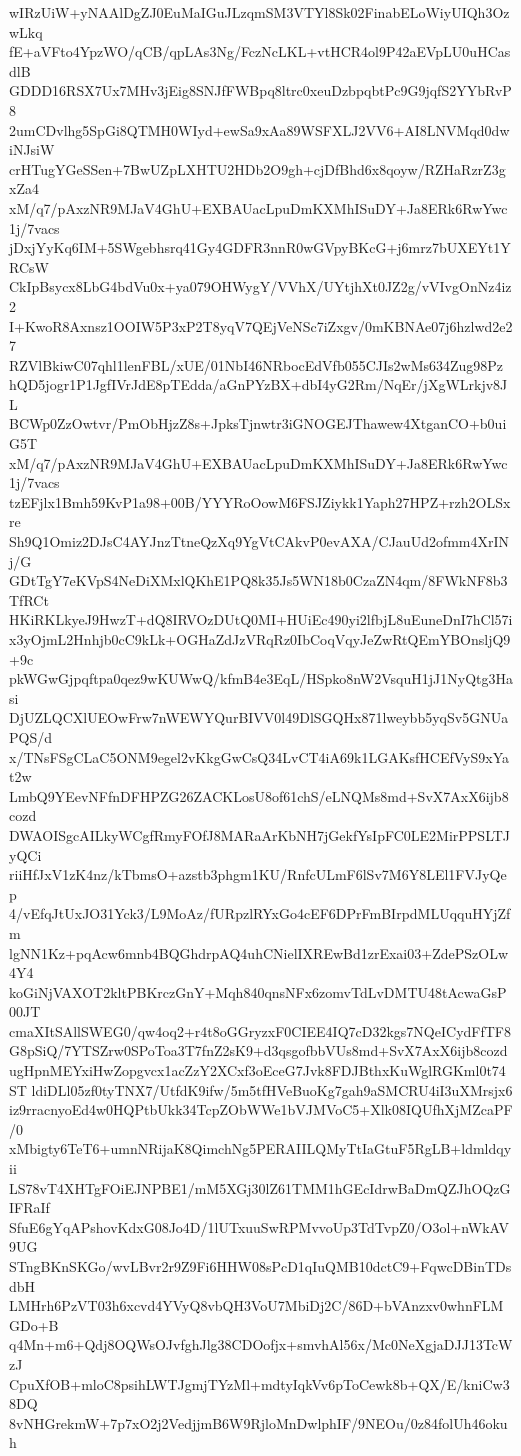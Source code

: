 wIRzUiW+yNAAlDgZJ0EuMaIGuJLzqmSM3VTYl8Sk02FinabELoWiyUIQh3OzwLkq
fE+aVFto4YpzWO/qCB/qpLAs3Ng/FczNcLKL+vtHCR4ol9P42aEVpLU0uHCasdlB
GDDD16RSX7Ux7MHv3jEig8SNJfFWBpq8ltrc0xeuDzbpqbtPc9G9jqfS2YYbRvP8
2umCDvlhg5SpGi8QTMH0WIyd+ewSa9xAa89WSFXLJ2VV6+AI8LNVMqd0dwiNJsiW
crHTugYGeSSen+7BwUZpLXHTU2HDb2O9gh+cjDfBhd6x8qoyw/RZHaRzrZ3gxZa4
xM/q7/pAxzNR9MJaV4GhU+EXBAUacLpuDmKXMhISuDY+Ja8ERk6RwYwc1j/7vacs
jDxjYyKq6IM+5SWgebhsrq41Gy4GDFR3nnR0wGVpyBKcG+j6mrz7bUXEYt1YRCsW
CkIpBsycx8LbG4bdVu0x+ya079OHWygY/VVhX/UYtjhXt0JZ2g/vVIvgOnNz4iz2
I+KwoR8Axnsz1OOIW5P3xP2T8yqV7QEjVeNSc7iZxgv/0mKBNAe07j6hzlwd2e27
RZVlBkiwC07qhl1lenFBL/xUE/01NbI46NRbocEdVfb055CJIs2wMs634Zug98Pz
hQD5jogr1P1JgfIVrJdE8pTEdda/aGnPYzBX+dbI4yG2Rm/NqEr/jXgWLrkjv8JL
BCWp0ZzOwtvr/PmObHjzZ8s+JpksTjnwtr3iGNOGEJThawew4XtganCO+b0uiG5T
xM/q7/pAxzNR9MJaV4GhU+EXBAUacLpuDmKXMhISuDY+Ja8ERk6RwYwc1j/7vacs
tzEFjlx1Bmh59KvP1a98+00B/YYYRoOowM6FSJZiykk1Yaph27HPZ+rzh2OLSxre
Sh9Q1Omiz2DJsC4AYJnzTtneQzXq9YgVtCAkvP0evAXA/CJauUd2ofmm4XrINj/G
GDtTgY7eKVpS4NeDiXMxlQKhE1PQ8k35Js5WN18b0CzaZN4qm/8FWkNF8b3TfRCt
HKiRKLkyeJ9HwzT+dQ8IRVOzDUtQ0MI+HUiEc490yi2lfbjL8uEuneDnI7hCl57i
x3yOjmL2Hnhjb0cC9kLk+OGHaZdJzVRqRz0IbCoqVqyJeZwRtQEmYBOnsljQ9+9c
pkWGwGjpqftpa0qez9wKUWwQ/kfmB4e3EqL/HSpko8nW2VsquH1jJ1NyQtg3Hasi
DjUZLQCXlUEOwFrw7nWEWYQurBIVV0l49DlSGQHx871lweybb5yqSv5GNUaPQS/d
x/TNsFSgCLaC5ONM9egel2vKkgGwCsQ34LvCT4iA69k1LGAKsfHCEfVyS9xYat2w
LmbQ9YEevNFfnDFHPZG26ZACKLosU8of61chS/eLNQMs8md+SvX7AxX6ijb8cozd
DWAOISgcAILkyWCgfRmyFOfJ8MARaArKbNH7jGekfYsIpFC0LE2MirPPSLTJyQCi
riiHfJxV1zK4nz/kTbmsO+azstb3phgm1KU/RnfcULmF6lSv7M6Y8LEl1FVJyQep
4/vEfqJtUxJO31Yck3/L9MoAz/fURpzlRYxGo4cEF6DPrFmBIrpdMLUqquHYjZfm
lgNN1Kz+pqAcw6mnb4BQGhdrpAQ4uhCNielIXREwBd1zrExai03+ZdePSzOLw4Y4
koGiNjVAXOT2kltPBKrczGnY+Mqh840qnsNFx6zomvTdLvDMTU48tAcwaGsP00JT
cmaXItSAllSWEG0/qw4oq2+r4t8oGGryzxF0CIEE4IQ7cD32kgs7NQeICydFfTF8
G8pSiQ/7YTSZrw0SPoToa3T7fnZ2sK9+d3qsgofbbVUs8md+SvX7AxX6ijb8cozd
ugHpnMEYxiHwZopgvcx1acZzY2XCxf3oEceG7Jvk8FDJBthxKuWglRGKml0t74ST
ldiDLl05zf0tyTNX7/UtfdK9ifw/5m5tfHVeBuoKg7gah9aSMCRU4iI3uXMrsjx6
iz9rracnyoEd4w0HQPtbUkk34TcpZObWWe1bVJMVoC5+Xlk08IQUfhXjMZcaPF/0
xMbigty6TeT6+umnNRijaK8QimchNg5PERAIILQMyTtIaGtuF5RgLB+ldmldqyii
LS78vT4XHTgFOiEJNPBE1/mM5XGj30lZ61TMM1hGEcIdrwBaDmQZJhOQzGIFRaIf
SfuE6gYqAPshovKdxG08Jo4D/1lUTxuuSwRPMvvoUp3TdTvpZ0/O3ol+nWkAV9UG
STngBKnSKGo/wvLBvr2r9Z9Fi6HHW08sPcD1qIuQMB10dctC9+FqwcDBinTDsdbH
LMHrh6PzVT03h6xcvd4YVyQ8vbQH3VoU7MbiDj2C/86D+bVAnzxv0whnFLMGDo+B
q4Mn+m6+Qdj8OQWsOJvfghJlg38CDOofjx+smvhAl56x/Mc0NeXgjaDJJ13TcWzJ
CpuXfOB+mloC8psihLWTJgmjTYzMl+mdtyIqkVv6pToCewk8b+QX/E/kniCw38DQ
8vNHGrekmW+7p7xO2j2VedjjmB6W9RjloMnDwlphIF/9NEOu/0z84folUh46okuh
